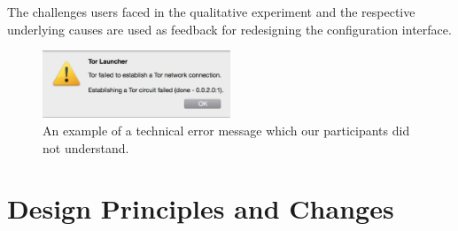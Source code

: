 \documentclass[USenglish,oneside,twocolumn]{article}
\begin{document}
{The challenges users faced in the qualitative experiment and the respective underlying causes are used as feedback for redesigning the configuration interface. 

\begin{figure}[t]
  \centering
    \includegraphics[width=0.5\textwidth]{error.png}
    \caption{An example of a technical error message which our participants did not understand.}
\label{fig:error}
\end{figure}

}

\section{Design Principles and Changes}
\label{sec:design} 
\end{document}
